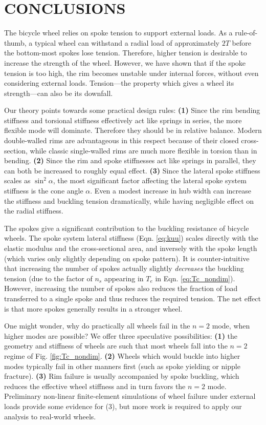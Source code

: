 \documentclass{bmd2016p}
\begin{document}
\section{CONCLUSIONS}
The bicycle wheel relies on spoke tension to support external loads. As a rule-of-thumb, a typical wheel can withstand a radial load of approximately $2T$ before the bottom-most spokes lose tension. Therefore, higher tension is desirable to increase the strength of the wheel. However, we have shown that if the spoke tension is too high, the rim becomes unstable under internal forces, without even considering external loads. Tension---the property which gives a wheel its strength---can also be its downfall.

Our theory points towards some practical design rules: \textbf{(1)} Since the rim bending stiffness and torsional stiffness effectively act like springs in series, the more flexible mode will dominate. Therefore they should be in relative balance. Modern double-walled rims are advantageous in this respect because of their closed cross-section, while classic single-walled rims are much more flexible in torsion than in bending. \textbf{(2)} Since the rim and spoke stiffnesses act like springs in parallel, they can both be increased to roughly equal effect. \textbf{(3)} Since the lateral spoke stiffness scales as $\sin^2{\alpha}$, the most significant factor affecting the lateral spoke system stiffness is the cone angle $\alpha$. Even a modest increase in hub width can increase the stiffness and buckling tension dramatically, while having negligible effect on the radial stiffness.

The spokes give a significant contribution to the buckling resistance of bicycle wheels. The spoke system lateral stiffness (Eqn. \ref{eq:kuu}) scales directly with the elastic modulus and the cross-sectional area, and inversely with the spoke length (which varies only slightly depending on spoke pattern). It is counter-intuitive that increasing the number of spokes actually slightly \textit{decreases} the buckling tension (due to the factor of $n_s$ appearing in $T_e$ in Eqn. \ref{eq:Tc_nondim}). However, increasing the number of spokes also reduces the fraction of load transferred to a single spoke and thus reduces the required tension. The net effect is that more spokes generally results in a stronger wheel.

One might wonder, why do practically all wheels fail in the $n=2$ mode, when higher modes are possible? We offer three speculative possibilities: \textbf{(1)} the geometry and stiffness of wheels are such that most wheels fall into the $n=2$ regime of Fig. \ref{fig:Tc_nondim}. \textbf{(2)} Wheels which would buckle into higher modes typically fail in other manners first (such as spoke yielding or nipple fracture). \textbf{(3)} Rim failure is usually accompanied by spoke buckling, which reduces the effective wheel stiffness and in turn favors the $n=2$ mode. Preliminary non-linear finite-element simulations of wheel failure under external loads provide some evidence for (3), but more work is required to apply our analysis to real-world wheels.
\end{document}
